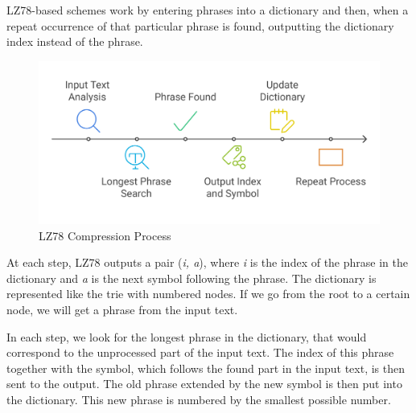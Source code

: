 LZ78-based schemes work by entering phrases into a dictionary and then, when a repeat occurrence of that particular phrase is found, outputting the dictionary index instead of the phrase.

\begin{figure}[ht]
    \centering
    \includegraphics[width=1\linewidth]{Figures/LZ78.png}
    \caption{LZ78 Compression Process}
    \label{fig:lz78}
\end{figure}

At each step, LZ78\cite{doc5} outputs a pair (\textit{i, a}), where \textit{i} is the index of the phrase in the dictionary and \textit{a} is the next symbol following the phrase. The dictionary is represented like the trie with numbered nodes. If we go from the root to a certain node, we will get a phrase from the input text.

\vspace{10pt}
In each step, we look for the longest phrase in the dictionary, that would correspond to the unprocessed part of the input text. The index of this phrase together with the symbol, which follows the found part in the input text, is then sent to the output. The old phrase extended by the new symbol is then put into the dictionary. This new phrase is numbered by the smallest possible number.